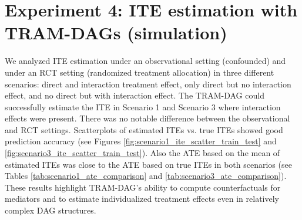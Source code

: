 














\section{Experiment 4: ITE estimation with TRAM-DAGs (simulation)} \label{sec:disc_experiment4}


We analyzed ITE estimation under an observational setting (confounded) and under an RCT setting (randomized treatment allocation) in three different scenarios: direct and interaction treatment effect, only direct but no interaction effect, and no direct but with interaction effect. The TRAM-DAG could successfully estimate the ITE in Scenario 1 and Scenario 3 where interaction effects were present. There was no notable difference between the observational and RCT settings. Scatterplots of estimated ITEs vs. true ITEs showed good prediction accuracy (see Figures \ref{fig:scenario1_ite_scatter_train_test} and \ref{fig:scenario3_ite_scatter_train_test}). Also the ATE based on the mean of estimated ITEs was close to the ATE based on true ITEs in both scenarios (see Tables \ref{tab:scenario1_ate_comparison} and \ref{tab:scenario3_ate_comparison}). These results highlight TRAM-DAG's ability to compute counterfactuals for mediators and to estimate individualized treatment effects even in relatively complex DAG structures.



